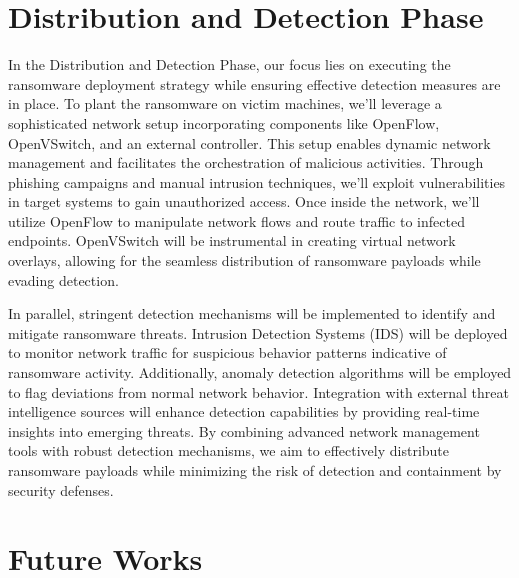 \documentclass[12pt,twocolumn]{article}
\begin{document}
\section{Distribution and Detection Phase}

In the Distribution and Detection Phase, our focus lies on executing the ransomware deployment strategy while ensuring effective detection measures are in place. To plant the ransomware on victim machines, we'll leverage a sophisticated network setup incorporating components like OpenFlow, OpenVSwitch, and an external controller. This setup enables dynamic network management and facilitates the orchestration of malicious activities. Through phishing campaigns and manual intrusion techniques, we'll exploit vulnerabilities in target systems to gain unauthorized access. Once inside the network, we'll utilize OpenFlow to manipulate network flows and route traffic to infected endpoints. OpenVSwitch will be instrumental in creating virtual network overlays, allowing for the seamless distribution of ransomware payloads while evading detection.

In parallel, stringent detection mechanisms will be implemented to identify and mitigate ransomware threats. Intrusion Detection Systems (IDS) will be deployed to monitor network traffic for suspicious behavior patterns indicative of ransomware activity. Additionally, anomaly detection algorithms will be employed to flag deviations from normal network behavior. Integration with external threat intelligence sources will enhance detection capabilities by providing real-time insights into emerging threats. By combining advanced network management tools with robust detection mechanisms, we aim to effectively distribute ransomware payloads while minimizing the risk of detection and containment by security defenses.


\section{Future Works}
\end{document}
